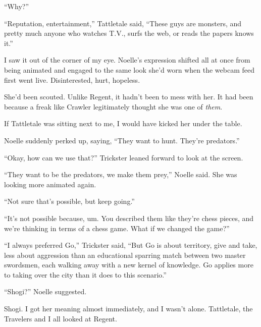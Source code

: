 ``Why?''



``Reputation, entertainment,'' Tattletale said, ``These guys are monsters, and pretty much anyone who watches T.V., surfs the web, or reads the papers knows it.''



I saw it out of the corner of my eye.  Noelle's expression shifted all at once from being animated and engaged to the same look she'd worn when the webcam feed first went live.  Disinterested, hurt, hopeless.



She'd been scouted.  Unlike Regent, it hadn't been to mess with her.  It had been because a freak like Crawler legitimately thought she was one of \emph{them}.



If Tattletale was sitting next to me, I would have kicked her under the table.



Noelle suddenly perked up, saying, ``They want to hunt.  They're predators.''



``Okay, how can we use that?'' Trickster leaned forward to look at the screen.



``They want to be the predators, we make them prey,'' Noelle said.  She was looking more animated again.



``Not sure that's possible, but keep going.''



``It's not possible because, um.  You described them like they're chess pieces, and we're thinking in terms of a chess game.  What if we changed the game?''



``I always preferred Go,'' Trickster said, ``But Go is about territory, give and take, less about aggression than an educational sparring match between two master swordsmen, each walking away with a new kernel of knowledge.  Go applies more to taking over the city than it does to this scenario.''



``Shogi?'' Noelle suggested.



Shogi.  I got her meaning almost immediately, and I wasn't alone. Tattletale, the Travelers and I all looked at Regent.



